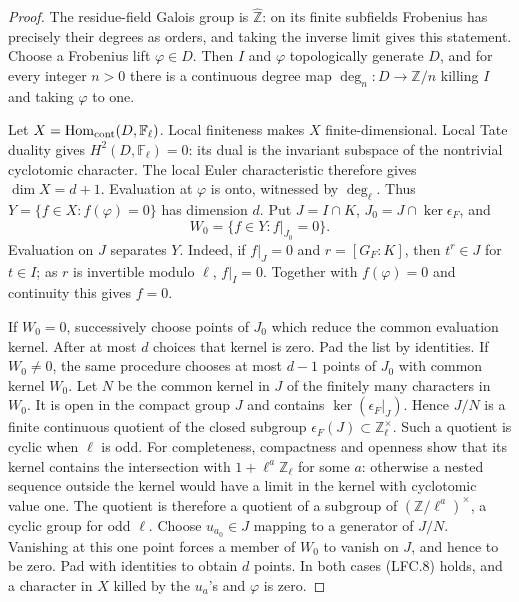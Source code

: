 \begin{proof}
The residue-field Galois group is \(\widehat{\mathbb Z}\):
on its finite subfields Frobenius has precisely their degrees
as orders, and taking the inverse limit gives this statement.
Choose a Frobenius lift \(\varphi\in D\).  Then \(I\) and
\(\varphi\) topologically generate \(D\), and for every
integer \(n>0\) there is a continuous degree map
\(\deg_n:D\to\mathbb Z/n\) killing \(I\) and taking
\(\varphi\) to one.

Let \(X=\operatorname{Hom}_{\rm cont}(D,\mathbb F_\ell)\).
Local finiteness makes \(X\) finite-dimensional.
Local Tate duality gives \(H^2(D,\mathbb F_\ell)=0\):
its dual is the invariant subspace of the nontrivial
cyclotomic character.  The local Euler characteristic therefore
gives \(\dim X=d+1\).
Evaluation at \(\varphi\) is onto, witnessed by \(\deg_\ell\).
Thus \(Y=\{f\in X:f(\varphi)=0\}\) has dimension \(d\).
Put \(J=I\cap K\), \(J_0=J\cap\ker\epsilon_F\), and
\[
                   W_0=\{f\in Y:f|_{J_0}=0\}.
 \]
Evaluation on \(J\) separates \(Y\).  Indeed, if \(f|_J=0\)
and \(r=[G_F:K]\), then \(t^r\in J\) for \(t\in I\);
as \(r\) is invertible modulo \(\ell\), \(f|_I=0\).
Together with \(f(\varphi)=0\) and continuity this gives
\(f=0\).

If \(W_0=0\), successively choose points of \(J_0\) which
reduce the common evaluation kernel.  After at most \(d\)
choices that kernel is zero.  Pad the list by identities.
If \(W_0\ne0\), the same procedure chooses at most \(d-1\)
points of \(J_0\) with common kernel \(W_0\).
Let \(N\) be the common kernel in \(J\) of the finitely many
characters in \(W_0\).  It is open in the compact group \(J\)
and contains \(\ker(\epsilon_F|_J)\).
Hence \(J/N\) is a finite continuous quotient of the closed
subgroup \(\epsilon_F(J)\subset\mathbb Z_\ell^\times\).
Such a quotient is cyclic when \(\ell\) is odd.
For completeness, compactness and openness show that its
kernel contains the intersection with \(1+\ell^a\mathbb Z_\ell\)
for some \(a\): otherwise a nested sequence outside the
kernel would have a limit in the kernel with cyclotomic value
one.  The quotient is therefore a quotient of a subgroup of
\((\mathbb Z/\ell^a)^\times\), a cyclic group for odd \(\ell\).
Choose \(u_{a_0}\in J\) mapping to a generator of \(J/N\).
Vanishing at this one point forces a member of \(W_0\) to
vanish on \(J\), and hence to be zero.  Pad with identities
to obtain \(d\) points.  In both cases (LFC.8) holds, and
a character in \(X\) killed by the \(u_a\)'s and \(\varphi\)
is zero.


\end{proof}
